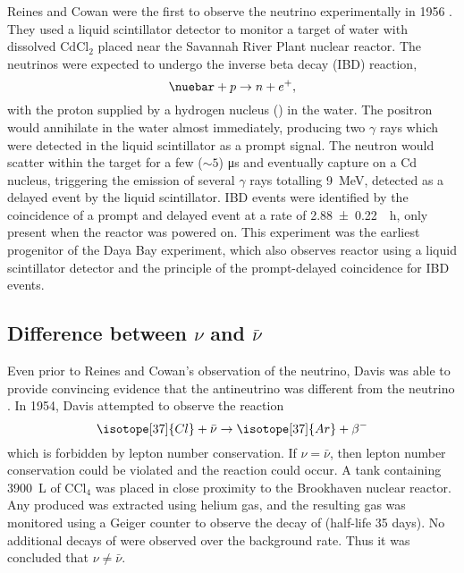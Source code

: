 Reines and Cowan were the first to observe the neutrino experimentally in 1956
\cite{reines_cowan}.
They used a liquid scintillator detector to monitor a target of
water with dissolved $\text{CdCl}_2$
placed near the Savannah River Plant nuclear reactor.
The neutrinos were expected to undergo the inverse beta decay (IBD) reaction,
\begin{equation}\label{eq:ibd}
    \nuebar + p \to n + e^+,
\end{equation}
with the proton supplied by a hydrogen nucleus () in the water.
The positron would annihilate in the water almost immediately,
producing two $\gamma$ rays which were detected in the liquid scintillator
as a prompt signal.
The neutron would scatter within the target for a few ($\sim5$) \si{\us}
and eventually capture on a Cd nucleus,
triggering the emission of several $\gamma$ rays totalling \SI{9}{\MeV},
detected as a delayed event by the liquid scintillator.
IBD events were identified by the coincidence of a prompt and delayed event
at a rate of \SI[per-mode=reciprocal]{2.88\pm0.22}{\per\hour},
only present when the reactor was powered on.
This experiment was the earliest progenitor of the Daya Bay experiment,
which also observes reactor \nuebar{} using a liquid scintillator detector
and the principle of the prompt-delayed coincidence for IBD events.

\subsection{Difference between \texorpdfstring{$\nu$ and $\bar{\nu}$}{nu and nu-bar}}
\label{subsec:nu_vs_nubar}

Even prior to Reines and Cowan's observation of the neutrino,
Davis was able to provide convincing evidence that
the antineutrino was different from the neutrino \cite{davis_diff_nuebar}.
In 1954, Davis attempted to observe the reaction
\begin{equation}\label{eq:davis_nubar}
    \isotope[37]{Cl} + \bar{\nu} \to \isotope[37]{Ar} + \beta^-
\end{equation}
which is forbidden by lepton number conservation.
If $\nu=\bar{\nu}$, then lepton number conservation could be violated
and the reaction could occur.
A tank containing \SI{3900}{\liter} of $\text{CCl}_4$
was placed in close proximity to the Brookhaven nuclear reactor.
Any  produced was extracted using helium gas,
and the resulting gas was monitored using a Geiger counter
to observe the decay of  (half-life 35 days).
No additional decays of  were observed over the background rate.
Thus it was concluded that $\nu\neq\bar{\nu}$.

